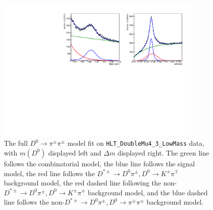 \begin{figure}[htp]
    \begin{center}
      \includegraphics[width=0.9\textwidth]{figures/chapter4/normalization_fit/dpipi_fit.pdf}
    \end{center}
    \caption{
      The full $D^0 \to \pi^\pm \pi^\pm$ model fit on \texttt{HLT\_DoubleMu4\_3\_LowMass} data, with $m(D^0)$ displayed left and $\Delta m$ displayed right. The green line follows the combinatorial model, the blue line follows the signal model, the red line follows the $D^{*\pm} \to D^0\pi^\pm, D^0 \to K^\pm \pi^\mp$ background model, the red dashed line following the non-$D^{*\pm} \to D^0\pi^\pm, D^0 \to K^\pm \pi^\mp$ background model, and the blue dashed line follows the non-$D^{*\pm} \to D^0\pi^\pm, D^0 \to \pi^\pm \pi^\pm$ background model.
    }
    \label{fig:d0pipi_uml_fit_dimuon}
\end{figure}


